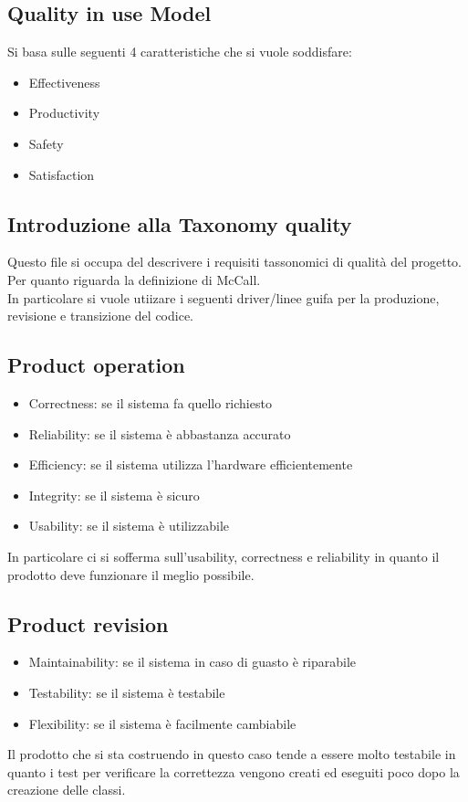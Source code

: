 \documentclass{article}
\begin{document}
\subsection{Quality in use Model}
Si basa sulle seguenti 4 caratteristiche che si vuole soddisfare:
\begin{itemize}
    \item Effectiveness
    \item Productivity
    \item Safety
    \item Satisfaction 
\end{itemize}

\subsection{Introduzione alla Taxonomy quality}
Questo file si occupa del descrivere i requisiti tassonomici di qualità del progetto.
\\Per quanto riguarda la definizione di McCall.
\\In particolare si vuole utiizare i seguenti driver/linee guifa per la produzione, revisione e
transizione  del codice.     
\subsection{Product operation}
\begin{itemize}
    \item Correctness: se il sistema fa quello richiesto
    \item Reliability: se il sistema è abbastanza accurato
    \item Efficiency: se il sistema utilizza l'hardware efficientemente
    \item Integrity: se il sistema è sicuro
    \item Usability: se il sistema è utilizzabile
\end{itemize}
In particolare ci si sofferma sull'usability, correctness e reliability in quanto il 
prodotto deve funzionare il meglio possibile.

\subsection{Product revision}
\begin{itemize}
    \item Maintainability: se il sistema in caso di guasto è riparabile
    \item Testability: se il sistema è testabile 
    \item Flexibility: se il sistema è facilmente cambiabile
\end{itemize}
Il prodotto che si sta costruendo in questo caso tende a essere molto testabile in 
quanto i test per verificare la correttezza vengono creati ed eseguiti poco dopo la  creazione
delle classi.
\end{document}
